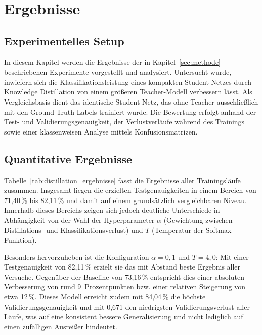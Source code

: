 \section{Ergebnisse}
\label{sec:ergebnisse}

\subsection{Experimentelles Setup}
In diesem Kapitel werden die Ergebnisse der in Kapitel~\ref{sec:methode} beschriebenen 
Experimente vorgestellt und analysiert. Untersucht wurde, inwiefern sich die Klassifikationsleistung
eines kompakten Student-Netzes durch Knowledge Distillation von einem größeren Teacher-Modell verbessern 
lässt. Als Vergleichsbasis dient das identische Student-Netz, das ohne Teacher ausschließlich mit den 
Ground-Truth-Labels trainiert wurde. Die Bewertung erfolgt anhand der Test- und Validierungsgenauigkeit, 
der Verlustverläufe während des Trainings sowie einer klassenweisen Analyse mittels Konfusionsmatrizen.

\subsection{Quantitative Ergebnisse}
\label{sec:quantitative_ergebnisse}
 
Tabelle~\ref{tab:distillation_ergebnisse} fasst die Ergebnisse aller Trainingsläufe zusammen. Insgesamt
liegen die erzielten Testgenauigkeiten in einem Bereich von 71{,}40\,\% bis 82{,}11\,\% und damit auf einem
grundsätzlich vergleichbaren Niveau. Innerhalb dieses Bereichs zeigen sich jedoch deutliche Unterschiede in
Abhängigkeit von der Wahl der Hyperparameter $\alpha$ (Gewichtung zwischen Distillations- und Klassifikationsverlust)
und $T$ (Temperatur der Softmax-Funktion).
 
Besonders hervorzuheben ist die Konfiguration $\alpha = 0{,}1$ und $T = 4{,}0$: Mit einer Testgenauigkeit von
82{,}11\,\% erzielt sie das mit Abstand beste Ergebnis aller Versuche. Gegenüber der Baseline von 73{,}16\,\% entspricht
dies einer absoluten Verbesserung von rund 9~Prozentpunkten bzw. einer relativen Steigerung von etwa 12\,\%. Dieses
Modell erreicht zudem mit 84{,}04\,\% die höchste Validierungsgenauigkeit und mit 0{,}671 den niedrigsten
Validierungsverlust aller Läufe, was auf eine konsistent bessere Generalisierung und nicht lediglich auf einen zufälligen
Ausreißer hindeutet.
 
